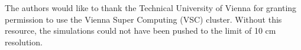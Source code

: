 \documentclass[pdfa]{drdc-report}
\begin{document}
\tableofcontents\clearpage
\listoffigures\clearpage
\listoftables
\begin{acknowledgements}
The authors would like to thank the Technical University of Vienna for granting permission to use the Vienna Super Computing (VSC) cluster. Without this resource, the simulations could not have been pushed to the limit of 10 cm resolution.
\end{acknowledgements}
\let\cleardoublepage\clearpage




















\clearpage
\printbibliography
% 
% 
 
\appendix








\docctl




\end{document}
